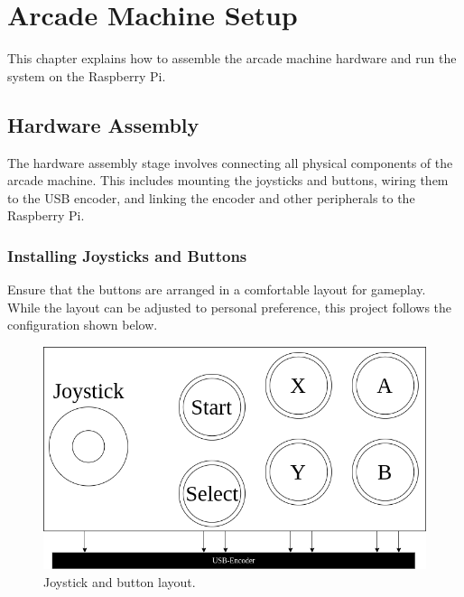 \chapter{Arcade Machine Setup}
\label{cha:arcade_machine_setup}

This chapter explains how to assemble the arcade machine hardware and run the system on the Raspberry Pi.

\section{Hardware Assembly}
\label{sec:hardware_assembly}

The hardware assembly stage involves connecting all physical components of the arcade machine. This includes mounting the joysticks and buttons, wiring them to the USB encoder, and linking the encoder and other peripherals to the Raspberry Pi.

\subsection{Installing Joysticks and Buttons}
\label{subsec:installing_joysticks_buttons}
Ensure that the buttons are arranged in a comfortable layout for gameplay. While the layout can be adjusted to personal preference, this project follows the configuration shown below.
\\
\begin{figure}[htb]
  \centering
  \includegraphics[scale=0.5]{F_Figures/button_layout.png}
  \caption{Joystick and button layout.}
  \label{fig:button_layout}
\end{figure}

